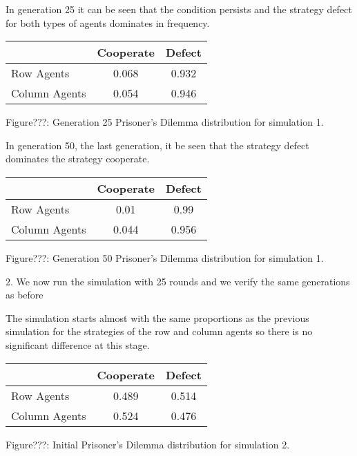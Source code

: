 \documentclass{article}
\begin{document}
In generation 25 it can be seen that the condition persists and the strategy defect for both types of agents dominates in frequency.
\begin{center}
\begin{tabular}{|l|c|c|}
\hline
& Cooperate & Defect \\ 
\hline
Row Agents & 0.068 & 0.932\\
\hline
Column Agents & 0.054 & 0.946\\
\hline
\end{tabular}
\end{center}
\begin{center}
Figure???: Generation 25 Prisoner’s Dilemma distribution for simulation 1.
\end{center}


In generation 50, the last generation, it be seen that the strategy defect dominates the strategy cooperate.
\begin{center}
\begin{tabular}{|l|c|c|}
\hline
& Cooperate & Defect \\ 
\hline
Row Agents & 0.01 & 0.99\\
\hline
Column Agents & 0.044 & 0.956\\
\hline
\end{tabular}
\end{center}
\begin{center}
Figure???: Generation 50 Prisoner’s Dilemma distribution for simulation 1.
\end{center}

2. We now run the simulation with 25 rounds and we verify the same generations as before

The simulation starts almost with the same proportions as the previous simulation for the strategies of the row and column agents so there is no significant difference at this stage.
\begin{center}
\begin{tabular}{|l|c|c|}
\hline
& Cooperate & Defect \\ 
\hline
Row Agents & 0.489 & 0.514\\
\hline
Column Agents & 0.524 & 0.476\\
\hline
\end{tabular}
\end{center}
\begin{center}
Figure???: Initial Prisoner’s Dilemma distribution for simulation 2.
\end{center}
\end{document}
